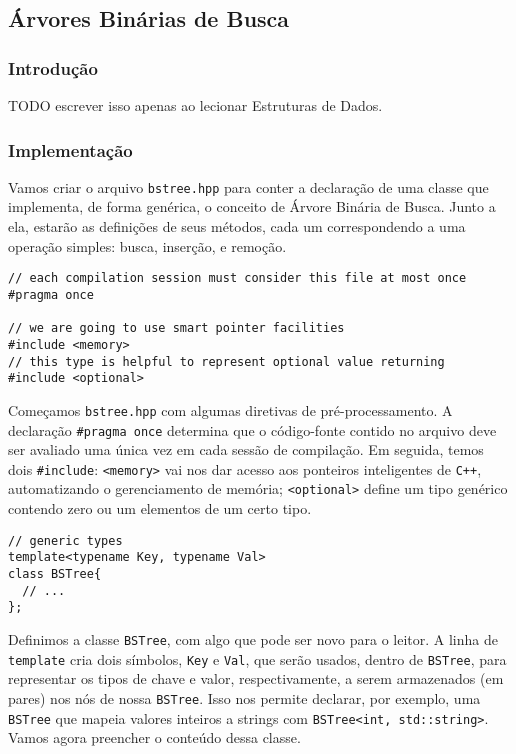 \documentclass[11pt]{article}
\begin{document}
\subsection{Árvores Binárias de Busca}
\label{sec:org575f560}

\subsubsection{Introdução}
\label{sec:orge319958}

TODO escrever isso apenas ao lecionar Estruturas de Dados.

\subsubsection{Implementação}
\label{sec:org7207aa6}

Vamos criar o arquivo \texttt{bstree.hpp} para conter a declaração de uma
classe que implementa, de forma genérica, o conceito de Árvore
Binária de Busca. Junto a ela, estarão as definições de seus
métodos, cada um correspondendo a uma operação simples: busca,
inserção, e remoção.

\begin{verbatim}
// each compilation session must consider this file at most once
#pragma once

// we are going to use smart pointer facilities
#include <memory>
// this type is helpful to represent optional value returning
#include <optional>
\end{verbatim}

Começamos \texttt{bstree.hpp} com algumas diretivas de pré-processamento.
A declaração \texttt{\#pragma once} determina que o código-fonte contido
no arquivo deve ser avaliado uma única vez em cada sessão de
compilação.  Em seguida, temos dois \texttt{\#include}: \texttt{<memory>} vai nos
dar acesso aos ponteiros inteligentes de \texttt{C++}, automatizando o
gerenciamento de memória; \texttt{<optional>} define um tipo genérico
contendo zero ou um elementos de um certo tipo.

\begin{verbatim}
// generic types
template<typename Key, typename Val>
class BSTree{
  // ...
};
\end{verbatim}

Definimos a classe \texttt{BSTree}, com algo que pode ser novo para o
leitor.  A linha de \texttt{template} cria dois símbolos, \texttt{Key} e \texttt{Val},
que serão usados, dentro de \texttt{BSTree}, para representar os tipos de
chave e valor, respectivamente, a serem armazenados (em pares) nos
nós de nossa \texttt{BSTree}.  Isso nos permite declarar, por exemplo,
uma \texttt{BSTree} que mapeia valores inteiros a strings com
\texttt{BSTree<int, std::string>}.  Vamos agora preencher o conteúdo
dessa classe.
\end{document}
